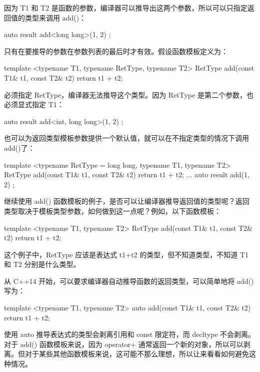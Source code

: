 因为 T1 和 T2 是函数的参数，编译器可以推导出这两个参数，所以可以只指定返回值的类型来调用 add()：

\begin{cpp}
auto result { add<long long>(1, 2) };
\end{cpp}

只有在要推导的参数在参数列表的最后时才有效。假设函数模板定义为：

\begin{cpp}
template <typename T1, typename RetType, typename T2>
RetType add(const T1& t1, const T2& t2) { return t1 + t2; }
\end{cpp}

必须指定 RetType，编译器无法推导这个类型。因为 RetType 是第二个参数，也必须显式指定 T1：

\begin{cpp}
auto result { add<int, long long>(1, 2) };
\end{cpp}

也可以为返回类型模板参数提供一个默认值，就可以在不指定类型的情况下调用add()了：

\begin{cpp}
template <typename RetType = long long, typename T1, typename T2>
RetType add(const T1& t1, const T2& t2) { return t1 + t2; }
...
auto result { add(1, 2) };
\end{cpp}


继续使用 add() 函数模板的例子，是否可以让编译器推导返回值的类型呢？返回类型取决于模板类型参数，如何做到这一点呢？例如，以下函数模板：

\begin{cpp}
template <typename T1, typename T2>
RetType add(const T1& t1, const T2& t2) { return t1 + t2; }
\end{cpp}

这个例子中，RetType 应该是表达式 t1+t2 的类型，但不知道类型，不知道 T1 和 T2 分别是什么类型。

从 C++14 开始，可以要求编译器自动推导函数的返回类型，可以简单地将 add() 写为：

\begin{cpp}
template <typename T1, typename T2>
auto add(const T1& t1, const T2& t2) { return t1 + t2; }
\end{cpp}

使用 auto 推导表达式的类型会剥离引用和 const 限定符，而 decltype 不会剥离。对于 add() 函数模板来说，因为 operator+ 通常返回一个新的对象，所以可以剥离。但对于某些其他函数模板来说，这可能不那么理想，所以让来看看如何避免这种情况。


